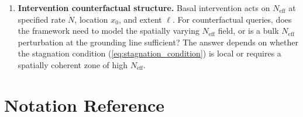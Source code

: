 \documentclass[11pt]{article}
\theoremstyle{definition}
\begin{document}
\begin{enumerate}
  \item \textbf{Intervention counterfactual structure.}  Basal intervention acts on $N_{\text{eff}}$ at specified rate $\dot{N}$, location $x_0$, and extent $\ell$.  For counterfactual queries, does the framework need to model the spatially varying $N_{\text{eff}}$ field, or is a bulk $N_{\text{eff}}$ perturbation at the grounding line sufficient?  The answer depends on whether the stagnation condition (\cref{eq:stagnation_condition}) is local or requires a spatially coherent zone of high $N_{\text{eff}}$.
\end{enumerate}


\section*{Notation Reference}
\end{document}
